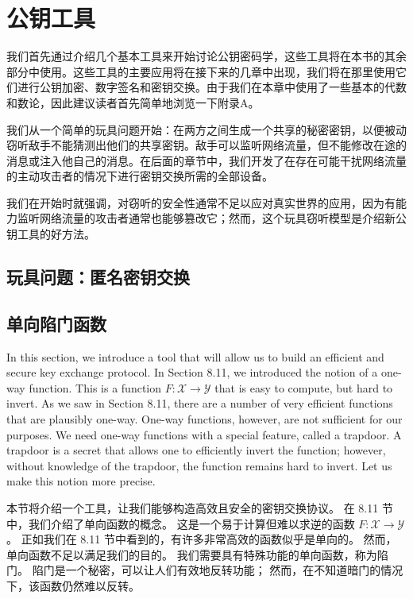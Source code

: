 \chapter{公钥工具}\label{chp:10IOP}
我们首先通过介绍几个基本工具来开始讨论公钥密码学，这些工具将在本书的其余部分中使用。这些工具的主要应用将在接下来的几章中出现，我们将在那里使用它们进行公钥加密、数字签名和密钥交换。由于我们在本章中使用了一些基本的代数和数论，因此建议读者首先简单地浏览一下附录A。

我们从一个简单的玩具问题开始：在两方之间生成一个共享的秘密密钥，以便被动窃听敌手不能猜测出他们的共享密钥。敌手可以监听网络流量，但不能修改在途的消息或注入他自己的消息。在后面的章节中，我们开发了在存在可能干扰网络流量的主动攻击者的情况下进行密钥交换所需的全部设备。

我们在开始时就强调，对窃听的安全性通常不足以应对真实世界的应用，因为有能力监听网络流量的攻击者通常也能够篡改它；然而，这个玩具窃听模型是介绍新公钥工具的好方法。

\section{玩具问题：匿名密钥交换}\label{10.1}
\section{单向陷门函数}\label{10.2}

In this section, we introduce a tool that will allow us to build an efficient and secure key exchange protocol. 
In Section 8.11, we introduced the notion of a one-way function. This is a function $F: \mathcal{X} \rightarrow \mathcal{Y}$ that is easy to compute, but hard to invert. 
As we saw in Section 8.11, there are a number of very efficient functions that are plausibly one-way. One-way functions, however, are not sufficient for our purposes. We need one-way functions with a special feature, called a trapdoor. A trapdoor is a secret that allows one to efficiently invert the function; however, without knowledge of the trapdoor, the function remains hard to invert.
Let us make this notion more precise.

本节将介绍一个工具，让我们能够构造高效且安全的密钥交换协议。 
在 8.11 节中，我们介绍了单向函数的概念。 
这是一个易于计算但难以求逆的函数 $F: \mathcal{X} \rightarrow \mathcal{Y}$。 
正如我们在 8.11 节中看到的，有许多非常高效的函数似乎是单向的。 然而，单向函数不足以满足我们的目的。 我们需要具有特殊功能的单向函数，称为陷门。 陷门是一个秘密，可以让人们有效地反转功能； 然而，在不知道暗门的情况下，该函数仍然难以反转。

